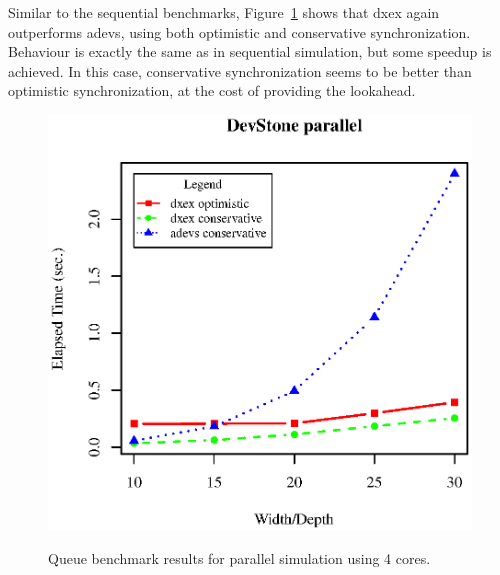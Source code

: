 Similar to the sequential benchmarks, Figure~\ref{fig:queue_benchmark_parallel} shows that dxex again outperforms adevs, using both optimistic and conservative synchronization.
Behaviour is exactly the same as in sequential simulation, but some speedup is achieved.
In this case, conservative synchronization seems to be better than optimistic synchronization, at the cost of providing the lookahead.

\begin{figure}
	\includegraphics[width=\columnwidth]{fig/fig2.eps}
	\label{fig:queue_benchmark_parallel}
	\caption{Queue benchmark results for parallel simulation using 4 cores.}
\end{figure}

